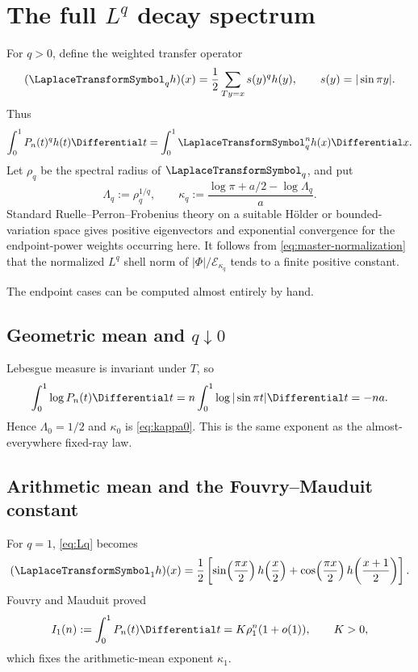 \documentclass[11pt]{article}
\theoremstyle{definition}
\theoremstyle{remark}
\newcommand{\T}{T}
\newcommand{\Ecal}{\mathcal E}
\begin{document}
\section{The full \texorpdfstring{\(L^q\)}{Lq} decay spectrum}
\label{sec:q-spectrum}

For \(q>0\), define the weighted transfer operator
\begin{equation}
 (\LaplaceTransformSymbol_qh)(x)=\frac12\sum_{\T y=x}s(y)^q h(y),
 \qquad s(y)=|\sin\pi y|.
 \label{eq:Lq}
\end{equation}
Thus
\begin{equation}
 \int_0^1P_n(t)^qh(t)\Differential t
 =\int_0^1\LaplaceTransformSymbol_q^nh(x)\Differential x.
 \label{eq:Lq-integral}
\end{equation}
Let \(\rho_q\) be the spectral radius of \(\LaplaceTransformSymbol_q\), and put
\begin{equation}
 \Lambda_q:=\rho_q^{1/q},
 \qquad
 \kappa_q:=\frac{\log\pi+a/2-\log\Lambda_q}{a}.
 \label{eq:kappa-q}
\end{equation}
Standard Ruelle--Perron--Frobenius theory on a suitable H\"older or
bounded-variation space\cite{baladi} gives positive eigenvectors and exponential
convergence for the endpoint-power weights occurring here.  It follows from
\eqref{eq:master-normalization} that the normalized \(L^q\) shell norm of
\(|\Phi|/\Ecal_{\kappa_q}\) tends to a finite positive constant.

The endpoint cases can be computed almost entirely by hand.

\subsection{Geometric mean and \texorpdfstring{\(q\downarrow0\)}{q to 0}}

Lebesgue measure is invariant under \(\T\), so
\begin{equation}
 \int_0^1\log P_n(t)\Differential t
 =n\int_0^1\log|\sin\pi t|\Differential t=-na.
 \label{eq:geometric-mean}
\end{equation}
Hence \(\Lambda_0=1/2\) and \(\kappa_0\) is \eqref{eq:kappa0}.  This is the
same exponent as the almost-everywhere fixed-ray law.

\subsection{Arithmetic mean and the Fouvry--Mauduit constant}

For \(q=1\), \eqref{eq:Lq} becomes
\begin{equation}
 (\LaplaceTransformSymbol_1h)(x)=\frac12\left[
 \sin\!\left(\frac{\pi x}{2}\right)h\!\left(\frac x2\right)
 +\cos\!\left(\frac{\pi x}{2}\right)h\!\left(\frac{x+1}{2}\right)
 \right].
 \label{eq:L1}
\end{equation}
Fouvry and Mauduit proved\cite{fouvrymauduit,ahl2017}
\begin{equation}
 I_1(n):=\int_0^1P_n(t)\Differential t
 =K\rho_1^n(1+o(1)),
 \qquad K>0,
 \label{eq:FM}
\end{equation}
which fixes the arithmetic-mean exponent \(\kappa_1\).
\end{document}
